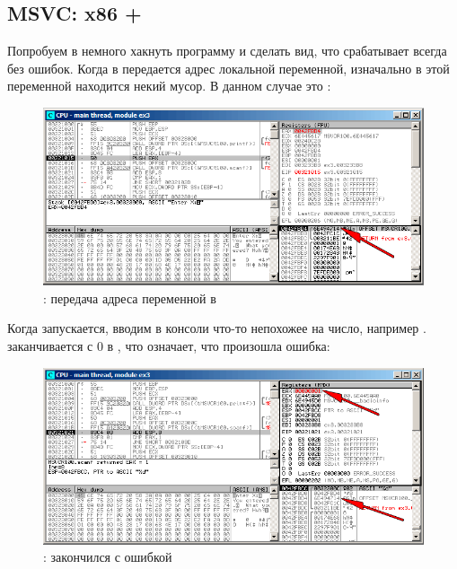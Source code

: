 \clearpage
\subsection{MSVC: x86 + \olly}

Попробуем в \olly немного хакнуть программу и сделать вид, что \scanf срабатывает всегда без ошибок.
Когда в \scanf передается адрес локальной переменной, изначально в этой переменной
находится некий мусор. В данном случае это :

\begin{figure}[H]
\centering
\includegraphics[scale=\FigScale]{patterns/04_scanf/3_checking_retval/olly_1.png}
\caption{\olly: передача адреса переменной в \scanf}
\label{fig:scanf_ex3_olly_1}
\end{figure}

\clearpage
Когда \scanf запускается, вводим в консоли что-то непохожее на число, например .
\scanf заканчивается с 0 в \EAX, что означает, что произошла ошибка:

\begin{figure}[H]
\centering
\includegraphics[scale=\FigScale]{patterns/04_scanf/3_checking_retval/olly_2.png}
\caption{\olly: \scanf закончился с ошибкой}
\label{fig:scanf_ex3_olly_2}
\end{figure}

